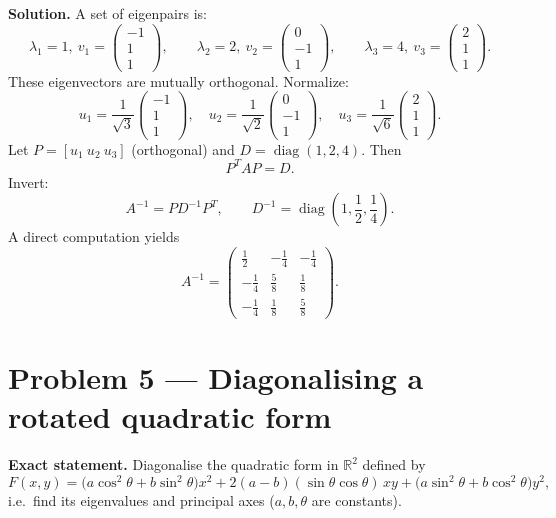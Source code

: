 \documentclass[12pt,a4paper]{article}
\theoremstyle{plain}
\theoremstyle{definition}      %
\begin{document}
\textbf{Solution.}
A set of eigenpairs is:
\[
\lambda_1=1,\ v_1=\begin{pmatrix}-1\\1\\1\end{pmatrix},\qquad
\lambda_2=2,\ v_2=\begin{pmatrix}0\\-1\\1\end{pmatrix},\qquad
\lambda_3=4,\ v_3=\begin{pmatrix}2\\1\\1\end{pmatrix}.
\]
These eigenvectors are mutually orthogonal. Normalize:
\[
u_1=\frac1{\sqrt3}\begin{pmatrix}-1\\1\\1\end{pmatrix},\quad
u_2=\frac1{\sqrt2}\begin{pmatrix}0\\-1\\1\end{pmatrix},\quad
u_3=\frac1{\sqrt6}\begin{pmatrix}2\\1\\1\end{pmatrix}.
\]
Let $P=[u_1\ u_2\ u_3]$ (orthogonal) and $D=\operatorname{diag}(1,2,4)$. Then
\[
P^TAP=D.
\]
Invert:
\[
A^{-1}=P D^{-1} P^T,\qquad D^{-1}=\operatorname{diag}\!\left(1,\frac12,\frac14\right).
\]
A direct computation yields
\[
A^{-1}=
\begin{pmatrix}
	\frac12&-\frac14&-\frac14\\[2pt]
	-\frac14&\frac58&\frac18\\[2pt]
	-\frac14&\frac18&\frac58
\end{pmatrix}.
\]

\section*{Problem 5 — Diagonalising a rotated quadratic form}

\textbf{Exact statement.}
Diagonalise the quadratic form in $\mathbb R^2$ defined by
\[
F(x,y)=\bigl(a\cos^2\theta+b\sin^2\theta\bigr)x^2
+2(a-b)(\sin\theta\cos\theta)\,xy
+\bigl(a\sin^2\theta+b\cos^2\theta\bigr)y^2,
\]
i.e.\ find its eigenvalues and principal axes ($a,b,\theta$ are constants).
\end{document}
